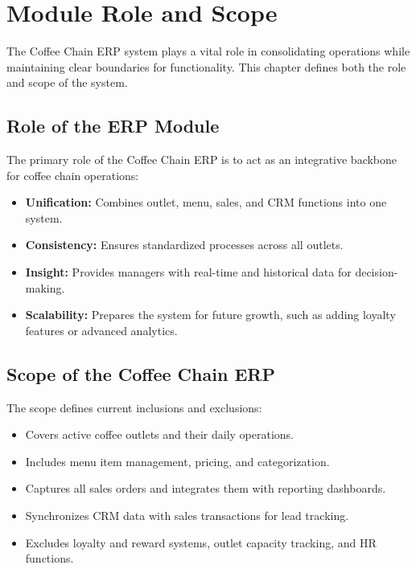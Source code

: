 \chapter{Module Role and Scope}

The Coffee Chain ERP system plays a vital role in consolidating operations while maintaining clear boundaries for functionality. This chapter defines both the role and scope of the system.

\section*{Role of the ERP Module}
The primary role of the Coffee Chain ERP is to act as an integrative backbone for coffee chain operations:
\begin{itemize}
    \item \textbf{Unification:} Combines outlet, menu, sales, and CRM functions into one system.  
    \item \textbf{Consistency:} Ensures standardized processes across all outlets.  
    \item \textbf{Insight:} Provides managers with real-time and historical data for decision-making.  
    \item \textbf{Scalability:} Prepares the system for future growth, such as adding loyalty features or advanced analytics.  
\end{itemize}

\section*{Scope of the Coffee Chain ERP}
The scope defines current inclusions and exclusions:
\begin{itemize}
    \item Covers active coffee outlets and their daily operations.  
    \item Includes menu item management, pricing, and categorization.  
    \item Captures all sales orders and integrates them with reporting dashboards.  
    \item Synchronizes CRM data with sales transactions for lead tracking.  
    \item Excludes loyalty and reward systems, outlet capacity tracking, and HR functions.  
\end{itemize}

